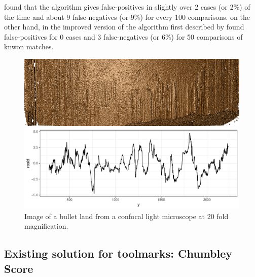 \documentclass[12pt]{article}
\begin{document}
\citep{chumbley} found that the algorithm gives false-positives in
slightly over 2 cases (or 2\%) of the time and about 9 false-negatives
(or 9\%) for every 100 comparisons. \citep{hadler} on the other hand, in
the improved version of the algorithm first described by
\citep{chumbley} found false-positives for 0 cases and 3 false-negatives
(or 6\%) for 50 comparisons of knwon matches.

\begin{figure}
\centering
\includegraphics[width=\textwidth]{images/B6-B2-L6.png}

\begin{center}\includegraphics[width=\textwidth]{figures/unnamed-chunk-1-1} \end{center}

\caption{\label{fig:rgl} Image of a bullet land from a confocal light microscope at 20 fold magnification.}

\end{figure}

\subsection{Existing solution for toolmarks: Chumbley
Score}\label{existing-solution-for-toolmarks-chumbley-score}

\end{document}
